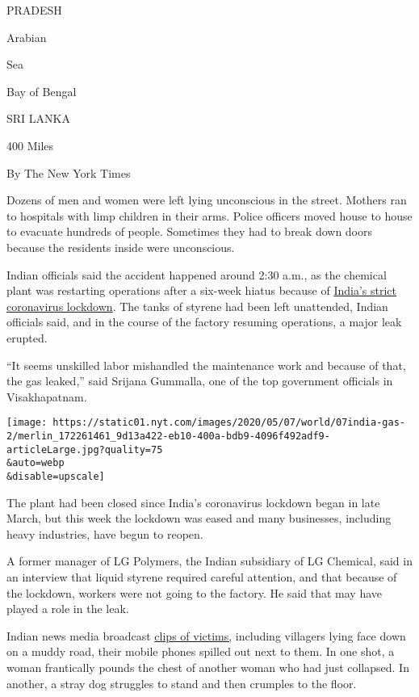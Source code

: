 PRADESH

Arabian

Sea

Bay of Bengal

SRI LANKA

400 Miles

By The New York Times

Dozens of men and women were left lying unconscious in the street.
Mothers ran to hospitals with limp children in their arms. Police
officers moved house to house to evacuate hundreds of people. Sometimes
they had to break down doors because the residents inside were
unconscious.

Indian officials said the accident happened around 2:30 a.m., as the
chemical plant was restarting operations after a six-week hiatus because
of
\href{https://www.nytimes.com/2020/05/01/world/asia/india-coronavirus-delhi.html}{India's
strict coronavirus lockdown}. The tanks of styrene had been left
unattended, Indian officials said, and in the course of the factory
resuming operations, a major leak erupted.

``It seems unskilled labor mishandled the maintenance work and because
of that, the gas leaked,'' said Srijana Gummalla, one of the top
government officials in Visakhapatnam.

\texttt{[image: https://static01.nyt.com/images/2020/05/07/world/07india-gas-2/merlin\_172261461\_9d13a422-eb10-400a-bdb9-4096f492adf9-articleLarge.jpg?quality=75\\\&auto=webp\\\&disable=upscale]}

The plant had been closed since India's coronavirus lockdown began in
late March, but this week the lockdown was eased and many businesses,
including heavy industries, have begun to reopen.

A former manager of LG Polymers, the Indian subsidiary of LG Chemical,
said in an interview that liquid styrene required careful attention, and
that because of the lockdown, workers were not going to the factory. He
said that may have played a role in the leak.

Indian news media broadcast
\href{https://timesofindia.indiatimes.com/city/visakhapatnam/vizag-over-1000-fall-sick-after-gas-leak-from-chemical-plant/articleshow/75590112.cms}{clips
of victims,} including villagers lying face down on a muddy road, their
mobile phones spilled out next to them. In one shot, a woman frantically
pounds the chest of another woman who had just collapsed. In another, a
stray dog struggles to stand and then crumples to the floor.

